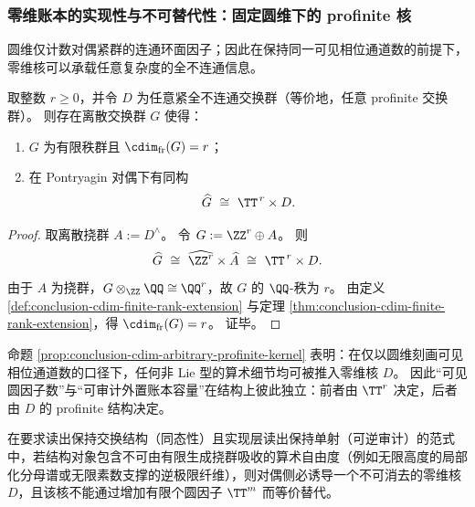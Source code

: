 \subsubsection{零维账本的实现性与不可替代性：固定圆维下的 profinite 核}\label{subsubsec:conclusion-cdim-profinite-realizability}
圆维仅计数对偶紧群的连通环面因子；因此在保持同一可见相位通道数的前提下，零维核可以承载任意复杂度的全不连通信息。

\begin{proposition}\label{prop:conclusion-cdim-arbitrary-profinite-kernel}
取整数 \(r\ge 0\)，并令 \(D\) 为任意紧全不连通交换群（等价地，任意 profinite 交换群）。
则存在离散交换群 \(G\) 使得：
\begin{enumerate}
  \item \(G\) 为有限秩群且 \(\cdim_{\mathrm{fr}}(G)=r\)；
  \item 在 Pontryagin 对偶下有同构
  \[
  \widehat G\ \cong\ \TT^{\,r}\times D.
  \]
\end{enumerate}
\end{proposition}
\begin{proof}
取离散挠群 \(A:=D^\wedge\)。
令 \(G:=\ZZ^r\oplus A\)。
则
\[
\widehat G\ \cong\ \widehat{\ZZ^r}\times \widehat A\ \cong\ \TT^{\,r}\times D.
\]
由于 \(A\) 为挠群，\(G\otimes_{\ZZ}\QQ\cong \QQ^r\)，故 \(G\) 的 \(\QQ\)-秩为 \(r\)。
由定义 \ref{def:conclusion-cdim-finite-rank-extension} 与定理 \ref{thm:conclusion-cdim-finite-rank-extension}，得 \(\cdim_{\mathrm{fr}}(G)=r\)。
证毕。
\end{proof}

\begin{remark}\label{rem:conclusion-cdim-profinite-kernel-ledger}
命题 \ref{prop:conclusion-cdim-arbitrary-profinite-kernel} 表明：在仅以圆维刻画可见相位通道数的口径下，任何非 Lie 型的算术细节均可被推入零维核 \(D\)。
因此“可见圆因子数”与“可审计外置账本容量”在结构上彼此独立：前者由 \(\TT^r\) 决定，后者由 \(D\) 的 profinite 结构决定。
\end{remark}

\begin{conjecture}[零维账本的不可替代性壁垒]\label{conj:conclusion-cdim-zero-dimensional-ledger-barrier}
在要求读出保持交换结构（同态性）且实现层读出保持单射（可逆审计）的范式中，若结构对象包含不可由有限生成挠群吸收的算术自由度（例如无限高度的局部化分母谱或无限素数支撑的逆极限纤维），则对偶侧必诱导一个不可消去的零维核 \(D\)，且该核不能通过增加有限个圆因子 \(\TT^m\) 而等价替代。
\end{conjecture}
